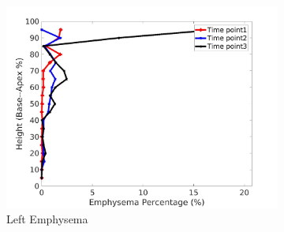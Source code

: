 \begin{figure}[H]
\begin{subfigure}{.42\linewidth}
  \includegraphics[width=\linewidth,trim={{.0\wd0} {.0\wd0} {.0\wd0} {.0\wd0}},clip]{Appendix/Image_AppexA/BaseToApex/IPF21LeftLungEmphysemaDiseaseAgainstHeight.jpg} %
  \caption{Left Emphysema}
  \label{fig:IPF21DiseaseAgainstHeight-g} 
\end{subfigure} 
\begin{subfigure}{.42\linewidth}%

\end{subfigure}
\end{figure}
